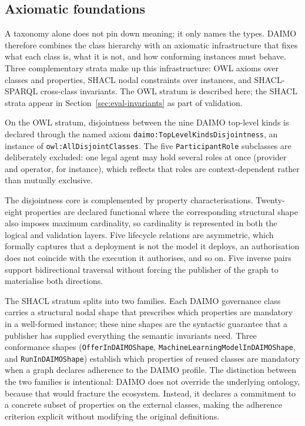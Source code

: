 \documentclass[11pt,a4paper]{article}
\newcommand{\code}[1]{\texttt{#1}}
\begin{document}
\subsection{Axiomatic foundations}\label{sec:axiomatic}

A taxonomy alone does not pin down meaning; it only names the types. DAIMO therefore combines the class hierarchy with an axiomatic infrastructure that fixes what each class is, what it is not, and how conforming instances must behave. Three complementary strata make up this infrastructure: OWL axioms over classes and properties, SHACL nodal constraints over instances, and SHACL-SPARQL cross-class invariants. The OWL stratum is described here; the SHACL strata appear in Section~\ref{sec:eval-invariants} as part of validation.

On the OWL stratum, disjointness between the nine DAIMO top-level kinds is declared through the named axiom \code{daimo:TopLevelKindsDisjointness}, an instance of \code{owl:AllDisjointClasses}. The five \code{ParticipantRole} subclasses are deliberately excluded: one legal agent may hold several roles at once (provider and operator, for instance), which reflects that roles are context-dependent rather than mutually exclusive.

The disjointness core is complemented by property characterisations. Twenty-eight properties are declared functional where the corresponding structural shape also imposes maximum cardinality, so cardinality is represented in both the logical and validation layers. Five lifecycle relations are asymmetric, which formally captures that a deployment is not the model it deploys, an authorisation does not coincide with the execution it authorises, and so on. Five inverse pairs support bidirectional traversal without forcing the publisher of the graph to materialise both directions.

The SHACL stratum splits into two families. Each DAIMO governance class carries a structural nodal shape that prescribes which properties are mandatory in a well-formed instance; these nine shapes are the syntactic guarantee that a publisher has supplied everything the semantic invariants need. Three conformance shapes (\code{OfferInDAIMOShape}, \code{MachineLearningModelInDAIMOShape}, and \code{RunInDAIMOShape}) establish which properties of reused classes are mandatory when a graph declares adherence to the DAIMO profile. The distinction between the two families is intentional: DAIMO does not override the underlying ontology, because that would fracture the ecosystem. Instead, it declares a commitment to a concrete subset of properties on the external classes, making the adherence criterion explicit without modifying the original definitions.
\end{document}

